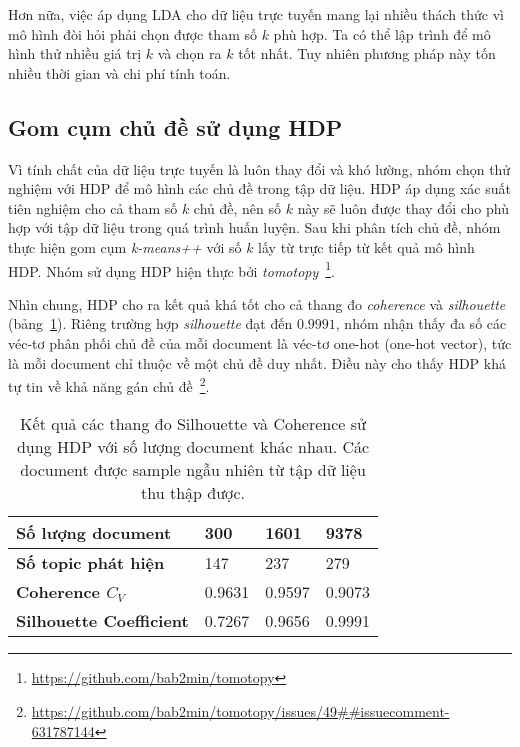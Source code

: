 Hơn nữa, việc áp dụng \acrshort{LDA} cho dữ liệu trực tuyến mang lại nhiều thách thức vì mô hình đòi hỏi phải chọn được tham số $k$ phù hợp. Ta có thể lập trình để mô hình thử nhiều giá trị $k$ và chọn ra $k$ tốt nhất. Tuy nhiên phương pháp này tốn nhiều thời gian và chi phí tính toán.

\subsection{Gom cụm chủ đề sử dụng HDP}
\label{hdp_experiments}
Vì tính chất của dữ liệu trực tuyến là luôn thay đổi và khó lường, nhóm chọn thử nghiệm với \acrshort{HDP} để mô hình các chủ đề trong tập dữ liệu. \acrshort{HDP} áp dụng xác suất tiên nghiệm cho cả tham số $k$ chủ đề, nên số $k$ này sẽ luôn được thay đổi cho phù hợp với tập dữ liệu trong quá trình huấn luyện. Sau khi phân tích chủ đề, nhóm thực hiện gom cụm \textit{k-means++} với số $k$ lấy từ trực tiếp từ kết quả mô hình \acrshort{HDP}. Nhóm sử dụng HDP hiện thực bởi \textit{tomotopy}~\footnote{\url{https://github.com/bab2min/tomotopy}}.

Nhìn chung, HDP cho ra kết quả khá tốt cho cả thang đo \textit{coherence} và \textit{silhouette} (bảng~\ref{table:hdp-result}). Riêng trường hợp \textit{silhouette} đạt đến $0.9991$, nhóm nhận thấy đa số các véc-tơ phân phối chủ đề của mỗi document là véc-tơ one-hot (one-hot vector), tức là mỗi document chỉ thuộc về một chủ đề duy nhất. Điều này cho thấy HDP khá tự tin về khả năng gán chủ đề~\footnote{\url{https://github.com/bab2min/tomotopy/issues/49##issuecomment-631787144}}.
\begin{table}[ht!]
    \centering
    \begin{tabular}{llll}
    \hline
    \textbf{Số lượng document}  & 300    & 1601   & 9378   \\ \hline
    \textbf{Số topic phát hiện} & 147    & 237    & 279    \\
    \textbf{Coherence $C_V$}          & 0.9631 & 0.9597 & 0.9073 \\
    \textbf{Silhouette Coefficient}         & 0.7267 & 0.9656 & 0.9991
    \end{tabular}
    \caption{Kết quả các thang đo Silhouette và Coherence sử dụng HDP với số lượng \acrshort{document} khác nhau. Các \acrshort{document} được sample ngẫu nhiên từ tập dữ liệu thu thập được.}
    \label{table:hdp-result}
\end{table}

